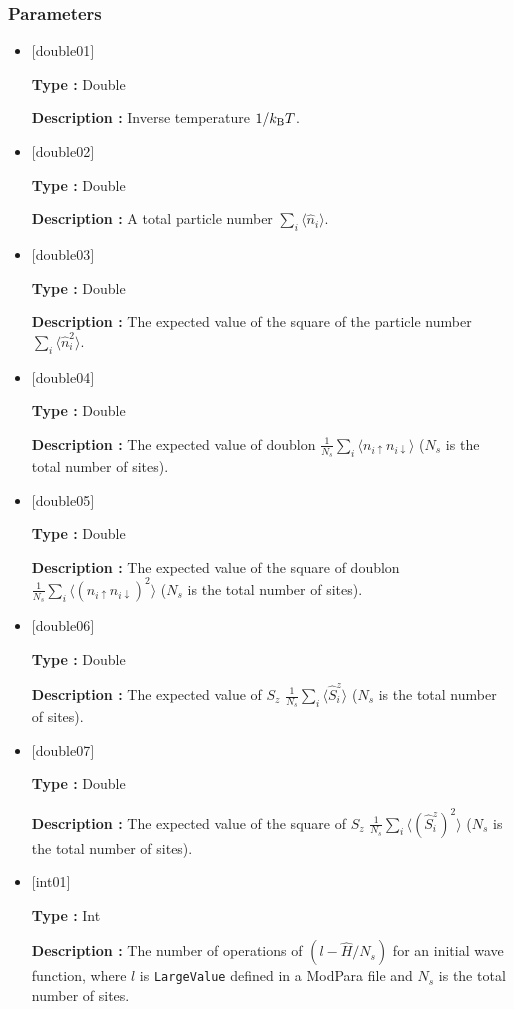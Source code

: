 \subsubsection{Parameters}
 \begin{itemize}

  \item  $[$double01$]$
  
 {\bf Type :} Double

{\bf Description :} Inverse temperature $1/{k_{\rm B}T}$.
 
  \item $[$double02$]$

 {\bf Type :} Double 

{\bf Description :}  A total particle number $\sum_{i} \langle \hat{n}_i \rangle$.

  \item $[$double03$]$

 {\bf Type :} Double 

{\bf Description :} The expected value of the square of the particle number $\sum_{i} \langle \hat{n}_i^2 \rangle$.

  \item $[$double04$]$

 {\bf Type :} Double 

{\bf Description :} The expected value of doublon $\frac{1}{N_s} \sum_{i}\langle n_{i\uparrow}n_{i\downarrow}\rangle$ ($N_s$ is the total number of sites).

  \item $[$double05$]$

 {\bf Type :} Double 

{\bf Description :} The expected value of the square of doublon 
$\frac{1}{N_s} \sum_{i}\langle (n_{i\uparrow} n_{i\downarrow})^2\rangle$ ($N_s$ is the total number of sites).

  \item $[$double06$]$

 {\bf Type :} Double 

{\bf Description :} The expected value of $S_z$
$\frac{1}{N_s} \sum_{i}\langle \hat{S}_i^z\rangle$ ($N_s$ is the total number of sites).

  \item $[$double07$]$

 {\bf Type :} Double 

{\bf Description :}  The expected value of the square of $S_z$
$\frac{1}{N_s} \sum_{i}\langle (\hat{S}_i^z)^2\rangle$ ($N_s$ is the total number of sites).

 \item $[$int01$]$

 {\bf Type :} Int 

{\bf Description :} The number of operations of $(l-\hat{H}/N_{s})$ for an initial wave function, where $l$ is \verb|LargeValue| defined in a ModPara file and $N_{s}$ is the total number of sites.

 \end{itemize}


